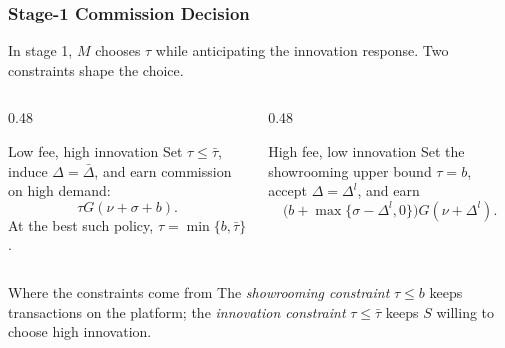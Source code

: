 \begin{frame}
  \frametitle{Stage-1 Commission Decision}
  \footnotesize
  In stage 1, $M$ chooses $\tau$ while anticipating the innovation response.
  Two constraints shape the choice.

  \begin{columns}[T,onlytextwidth]
    \begin{column}{0.48\textwidth}
      \begin{block}{Low fee, high innovation}
        Set $\tau\leq\bar{\tau}$, induce $\Delta=\bar{\Delta}$, and earn
        commission on high demand:
        \[
          \tau G(\nu+\sigma+b).
        \]
        At the best such policy, $\tau=\min\{b,\bar{\tau}\}$.
      \end{block}
    \end{column}

    \begin{column}{0.48\textwidth}
      \begin{block}{High fee, low innovation}
        Set the showrooming upper bound $\tau=b$, accept
        $\Delta=\Delta^l$, and earn
        \[
          \bigl(b+\max\{\sigma-\Delta^l,0\}\bigr)G(\nu+\Delta^l).
        \]
      \end{block}
    \end{column}
  \end{columns}

  \begin{alertblock}{Where the constraints come from}
    The \textit{showrooming constraint} $\tau\leq b$ keeps transactions on
    the platform; the \textit{innovation constraint} $\tau\leq\bar{\tau}$
    keeps $S$ willing to choose high innovation.
  \end{alertblock}
\end{frame}

